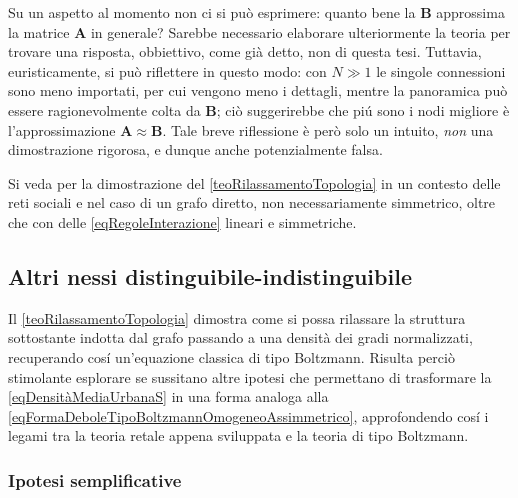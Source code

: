       \begin{oss}
        \label{ossBontaApprossimazione}
        Su un aspetto al momento non ci si può esprimere: quanto bene la \(\mathbf B\) approssima la matrice \(\mathbf A\) in generale? Sarebbe necessario elaborare ulteriormente la teoria per trovare una risposta, obbiettivo, come già detto, non di questa tesi. Tuttavia, euristicamente, si può riflettere in questo modo: con \(N\gg1\) le singole connessioni sono meno importati, per cui vengono meno i dettagli, mentre la panoramica può essere ragionevolmente colta da \(\mathbf B\); ciò suggerirebbe che piú sono i nodi migliore è l'approssimazione \(\mathbf A\approx\mathbf B\). Tale breve riflessione è però solo un intuito, \textit{non} una dimostrazione rigorosa, e dunque anche potenzialmente falsa.
      \end{oss}

      \begin{oss}
        Si veda \cite{Nurisso2024} per la dimostrazione del \cref{teoRilassamentoTopologia} in un contesto delle reti sociali e nel caso di un grafo diretto, non necessariamente simmetrico, oltre che con delle \ref{eqRegoleInterazione} lineari e simmetriche.
      \end{oss}

    \subsection{Altri nessi distinguibile-indistinguibile}\label{secNessiDI}

      Il \cref{teoRilassamentoTopologia} dimostra come si possa rilassare la struttura sottostante indotta dal grafo passando a una densità dei gradi normalizzati, recuperando cosí un'equazione classica di tipo Boltzmann. Risulta perciò stimolante esplorare se sussitano altre ipotesi che permettano di trasformare la \ref{eqDensitàMediaUrbanaS} in una forma analoga alla \ref{eqFormaDeboleTipoBoltzmannOmogeneoAssimmetrico}, approfondendo cosí i legami tra la teoria retale appena sviluppata e la teoria di tipo Boltzmann.

      \subsubsection{Ipotesi semplificative}


